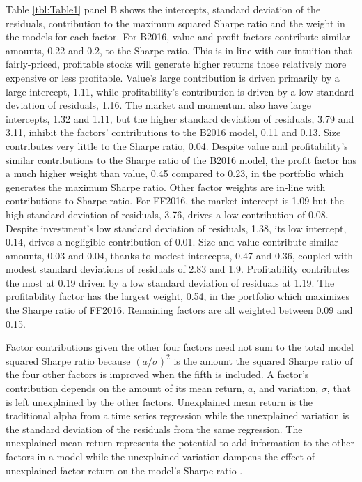 Table \ref{tbl:Table1} panel B shows the intercepts, standard deviation of the residuals,
contribution to the maximum squared Sharpe ratio and the weight in the models for each
factor. For B2016, value and profit factors contribute similar amounts, 0.22 and 0.2, to
the Sharpe  ratio. This is in-line with our intuition that fairly-priced, profitable
stocks will generate higher  returns those relatively more expensive or less profitable.
Value's large contribution is driven primarily by a large intercept, 1.11, while
profitability's contribution is driven by a low standard deviation of residuals, 1.16. The
market and momentum also have large intercepts, 1.32 and  1.11, but the higher standard
deviation of residuals, 3.79 and 3.11, inhibit the factors' contributions to the B2016
model,  0.11 and 0.13. Size contributes very little to the Sharpe ratio, 0.04. Despite
value and profitability's similar contributions to the Sharpe ratio of the B2016  model,
the profit factor has a much higher weight than value, 0.45 compared to 0.23, in the
portfolio which generates the maximum Sharpe ratio. Other factor weights are in-line with
contributions to Sharpe ratio. For FF2016, the market intercept is 1.09 but the high
standard deviation of residuals, 3.76,  drives a low contribution of 0.08. Despite
investment's low standard deviation of residuals, 1.38, its low intercept, 0.14,  drives a
negligible contribution of 0.01. Size and value contribute similar amounts, 0.03 and 0.04,
thanks to modest intercepts, 0.47  and 0.36, coupled with modest standard deviations of
residuals of 2.83 and 1.9. Profitability contributes the most at 0.19 driven by a low
standard deviation of residuals at  1.19. The profitability factor has the largest weight,
0.54, in the portfolio which maximizes the  Sharpe ratio of FF2016. Remaining factors are
all weighted between 0.09 and 0.15.

Factor contributions given the other four factors need not sum to the total model squared
Sharpe ratio because $(a/\sigma)^2$ is the amount the squared Sharpe ratio of the four
other  factors is improved when the fifth is included. A factor's contribution depends on
the amount of its mean return, $a$, and variation,  $\sigma$, that is left unexplained by
the other factors. Unexplained mean return is the traditional alpha from a time series
regression while the  unexplained variation is the standard deviation of the residuals
from the same regression. The unexplained mean return represents the potential to add
information to the other factors  in a model while the unexplained variation dampens the
effect of unexplained factor return on  the model's Sharpe ratio
\parencite{fama2016choosing}.
